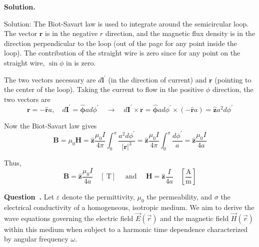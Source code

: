 \documentclass[12pt, a4paper, oneside]{report}
\newcounter{question}
\newenvironment{question}[1][]{\refstepcounter{question}\par\medskip
   \begin{mdframed}[backgroundcolor=gray!20]
   \noindent \textbf{Question~\thequestion. #1} \rmfamily}{\end{mdframed}\medskip}
\newenvironment{solution}{
  \par\medskip\noindent
  \textbf{Solution.}\quad\itshape
  \par\noindent\makebox[\linewidth]{\rule{\textwidth}{0.4pt}}
}{
  \par\noindent\makebox[\linewidth]{\rule{\textwidth}{0.4pt}}
  \par\medskip
}
\begin{document}
\begin{solution}
Solution: The Biot-Savart law is used to integrate around the semicircular loop. The vector $\mathbf{r}$ is in the negative $r$ direction, and the magnetic flux density is in the direction perpendicular to the loop (out of the page for any point inside the loop). The contribution of the straight wire is zero since for any point on the straight wire, $\sin \phi$ in is zero.

The two vectors necessary are $d \mathbf{l}^{\prime}$ (in the direction of current) and $\mathbf{r}$ (pointing to the center of the loop). Taking the current to flow in the positive $\phi$ direction, the two vectors are
$$
\mathbf{r}=-\hat{\mathbf{r}} a, \quad d \mathbf{I}^{\prime}=\hat{\boldsymbol{\phi}} a d \phi^{\prime} \quad \rightarrow \quad d \mathbf{I}^{\prime} \times \mathbf{r}=\hat{\boldsymbol{\phi}} a d \phi^{\prime} \times(-\hat{\mathbf{r}} a)=\hat{\mathbf{z}} a^2 d \phi^{\prime}
$$

Now the Biot-Savart law gives
$$
\mathbf{B}=\mu_0 \mathbf{H}=\hat{\mathbf{z}} \frac{\mu_0 I}{4 \pi} \int_0^\pi \frac{a^2 d \phi^{\prime}}{|\mathbf{r}|^3}=\hat{\mathbf{z}} \frac{\mu_0 I}{4 \pi} \int_0^\pi \frac{d \phi^{\prime}}{a}=\hat{\mathbf{z}} \frac{\mu_0 I}{4 a}
$$

Thus,
$$
\mathbf{B}=\hat{\mathbf{z}} \frac{\mu_0 I}{4 a} \quad[\mathrm{~T}] \quad \text { and } \quad \mathbf{H}=\hat{\mathbf{z}} \frac{I}{4 a} \quad\left[\frac{\mathrm{A}}{\mathrm{m}}\right]
$$
\end{solution}



\begin{question}
Let \(\varepsilon\) denote the permittivity, \(\mu_0\) the permeability, and \(\sigma\) the electrical conductivity of a homogeneous, isotropic medium. We aim to derive the wave equations governing the electric field \(\vec{E}(\vec{r})\) and the magnetic field \(\vec{H}(\vec{r})\) within this medium when subject to a harmonic time dependence characterized by angular frequency \(\omega\).
\end{question}
\end{document}
